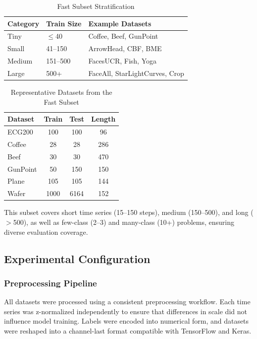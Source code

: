\documentclass[conference]{IEEEtran}
\begin{document}
\begin{table}[htbp]
\caption{Fast Subset Stratification}
\label{tab:subset}
\centering
\small
\begin{tabular}{lll}
\toprule
\textbf{Category} & \textbf{Train Size} & \textbf{Example Datasets} \\
\midrule
Tiny & $\leq$40 & Coffee, Beef, GunPoint \\
Small & 41--150 & ArrowHead, CBF, BME \\
Medium & 151--500 & FacesUCR, Fish, Yoga \\
Large & 500+ & FaceAll, StarLightCurves, Crop \\
\bottomrule
\end{tabular}
\end{table}

\begin{table}[htbp]
\caption{Representative Datasets from the Fast Subset}
\label{tab:representative}
\centering
\small
\begin{tabular}{lccc}
\toprule
\textbf{Dataset} & \textbf{Train} & \textbf{Test} & \textbf{Length} \\
\midrule
ECG200 & 100 & 100 & 96 \\
Coffee & 28 & 28 & 286 \\
Beef & 30 & 30 & 470 \\
GunPoint & 50 & 150 & 150 \\
Plane & 105 & 105 & 144 \\
Wafer & 1000 & 6164 & 152 \\
\bottomrule
\end{tabular}
\end{table}

This subset covers short time series (15--150 steps), medium (150--500), and long ($>$500), as well as few-class (2--3) and many-class (10+) problems, ensuring diverse evaluation coverage.

\subsection{Experimental Configuration}

\subsubsection{Preprocessing Pipeline}
All datasets were processed using a consistent preprocessing workflow. Each time series was z-normalized independently to ensure that differences in scale did not influence model training. Labels were encoded into numerical form, and datasets were reshaped into a channel-last format compatible with TensorFlow and Keras.
\end{document}
